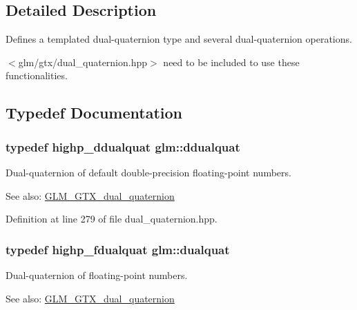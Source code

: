 \subsection{Detailed Description}
Defines a templated dual-quaternion type and several dual-quaternion operations. 

$<$glm/gtx/dual\_\-quaternion.hpp$>$ need to be included to use these functionalities. 

\subsection{Typedef Documentation}
\hypertarget{group__gtc__dual__quaternion_g373431ffdd82d5c03c258217a9e1f1a6}{
\subsubsection[ddualquat]{\setlength{\rightskip}{0pt plus 5cm}typedef highp\_\-ddualquat {\bf glm::ddualquat}}}
\label{group__gtc__dual__quaternion_g373431ffdd82d5c03c258217a9e1f1a6}


Dual-quaternion of default double-precision floating-point numbers.

\begin{Desc}
\item[See also:]\hyperlink{group__gtc__dual__quaternion}{GLM\_\-GTX\_\-dual\_\-quaternion} \end{Desc}


Definition at line 279 of file dual\_\-quaternion.hpp.\hypertarget{group__gtc__dual__quaternion_g2f6227b5f9dc08a2e7682065a84b3aa9}{
\subsubsection[dualquat]{\setlength{\rightskip}{0pt plus 5cm}typedef highp\_\-fdualquat {\bf glm::dualquat}}}
\label{group__gtc__dual__quaternion_g2f6227b5f9dc08a2e7682065a84b3aa9}


Dual-quaternion of floating-point numbers.

\begin{Desc}
\item[See also:]\hyperlink{group__gtc__dual__quaternion}{GLM\_\-GTX\_\-dual\_\-quaternion} \end{Desc}


